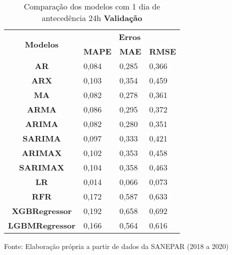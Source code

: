 \begin{table}[H]
	\centering
	\caption{Comparação dos modelos com 1 dia de antecedência 24h \textbf{Validação} }\label{tb:1-24vld}
	\begin{tabular}{@{}clll@{}}
		\toprule
		\multirow{2}{*}{\textbf{Modelos}} & \multicolumn{3}{c}{\textbf{Erros}}                                                                       \\ \cmidrule(l){2-4} 
		& \multicolumn{1}{c}{\textbf{MAPE}} & \multicolumn{1}{c}{\textbf{MAE}} & \multicolumn{1}{c}{\textbf{RMSE}} \\ \hline
\textbf{AR}                       & 0,084                             & 0,285                            & 0,366                             \\
\textbf{ARX}                      & 0,103                             & 0,354                            & 0,459                             \\
\textbf{MA}                       & 0,082                             & 0,278                            & 0,361                             \\
\textbf{ARMA}                     & 0,086                             & 0,295                            & 0,372                             \\
\textbf{ARIMA}                    & 0,082                             & 0,280                            & 0,351                             \\
\textbf{SARIMA}                   & 0,097                             & 0,333                            & 0,421                             \\
\textbf{ARIMAX}                   & 0,102                             & 0,353                            & 0,458                             \\
\textbf{SARIMAX}                  & 0,104                             & 0,358                            & 0,463                             \\
\textbf{LR}                       & 0,014                             & 0,066                            & 0,073                             \\
\textbf{RFR}                      & 0,172                             & 0,587                            & 0,633                             \\
\textbf{XGBRegressor}             & 0,192                             & 0,658                            & 0,692                             \\
\textbf{LGBMRegressor}            & 0,166                             & 0,564                            & 0,616                             \\ \bottomrule
	\end{tabular}

Fonte: Elaboração própria a partir de dados da SANEPAR (2018 a 2020)
\end{table}

